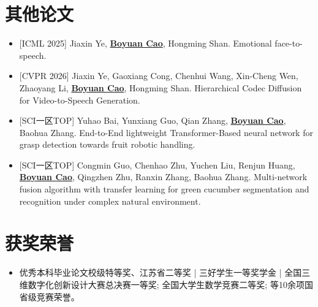 \documentclass{resume}
\begin{document}
\section{其他论文}
\begin{itemize}[parsep=\itemparsep]
  \item {}[ICML 2025] Jiaxin Ye, \underline{\textbf{Boyuan Cao}}, Hongming Shan.
  Emotional face-to-speech.
  \item {}[CVPR 2026] Jiaxin Ye, Gaoxiang Cong, Chenhui Wang, Xin-Cheng Wen, Zhaoyang Li, \underline{\textbf{Boyuan Cao}}, Hongming Shan.
  Hierarchical Codec Diffusion for Video-to-Speech Generation.
  \item {}[SCI一区TOP] Yuhao Bai, Yunxiang Guo, Qian Zhang, \underline{\textbf{Boyuan Cao}}, Baohua Zhang.
  End-to-End lightweight Transformer-Based neural network for grasp detection towards fruit robotic handling.
  \item {}[SCI一区TOP] Congmin Guo, Chenhao Zhu, Yuchen Liu, Renjun Huang, \underline{\textbf{Boyuan Cao}}, Qingzhen Zhu, Ranxin Zhang, Baohua Zhang.
  Multi-network fusion algorithm with transfer learning for green cucumber segmentation and recognition under complex natural environment.
\end{itemize}


\section{获奖荣誉}
\begin{itemize}[parsep=\itemparsep]
  \item 优秀本科毕业论文校级特等奖、江苏省二等奖 | 三好学生一等奖学金 | 全国三维数字化创新设计大赛总决赛一等奖; 全国大学生数学竞赛二等奖; 等10余项国省级竞赛荣誉。
\end{itemize}


\end{document}

